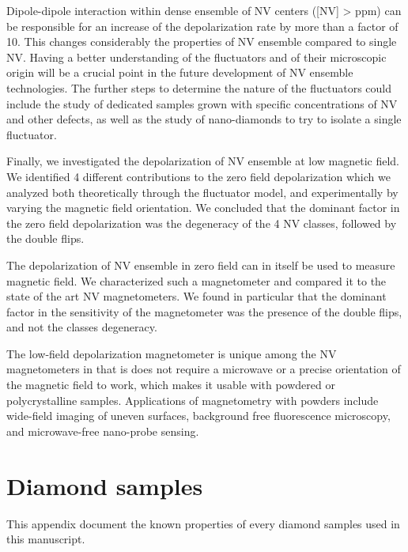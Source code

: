 \documentclass[a4paper, 11pt]{report}
\begin{document}
Dipole-dipole interaction within dense ensemble of NV centers ([NV] > ppm) can be responsible for an increase of the depolarization rate by more than a factor of 10. This changes considerably the properties of NV ensemble compared to single NV. Having a better understanding of the fluctuators and of their microscopic origin will be a crucial point in the future development of NV ensemble technologies. The further steps to determine the nature of the fluctuators could include the study of dedicated samples grown with specific concentrations of NV and other defects, as well as the study of nano-diamonds to try to isolate a single fluctuator.

Finally, we investigated the depolarization of NV ensemble at low magnetic field. We identified 4 different contributions to the zero field depolarization which we analyzed both theoretically through the fluctuator model, and experimentally by varying the magnetic field orientation. We concluded that the dominant factor in the zero field depolarization was the degeneracy of the 4 NV classes, followed by the double flips. 

The depolarization of NV ensemble in zero field can in itself be used to measure magnetic field. We characterized such a magnetometer and compared it to the state of the art NV magnetometers. We found in particular that the dominant factor in the sensitivity of the magnetometer was the presence of the double flips, and not the classes degeneracy. 

The low-field depolarization magnetometer is unique among the NV magnetometers in that is does not require a microwave or a precise orientation of the magnetic field to work, which makes it usable with powdered or polycrystalline samples. Applications of magnetometry with powders include wide-field imaging of uneven surfaces, background free fluorescence microscopy, and microwave-free nano-probe sensing.


\appendix
 
\chapter{Diamond samples}
\label{Appendix samples}
This appendix document the known properties of every diamond samples used in this manuscript.
\end{document}
